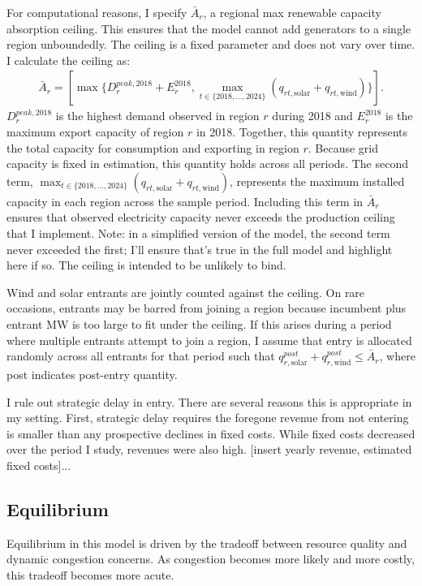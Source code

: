 \documentclass[12pt]{article}
\begin{document}
For computational reasons, I specify $\bar{A}_r$, a regional max renewable capacity absorption ceiling. This ensures that the model cannot add generators to a single region unboundedly. The ceiling is a fixed parameter and does not vary over time. I calculate the ceiling as: 
\begin{align}
    \bar{A}_r = [\max \{D^{peak,2018}_r + E^{2018}_r, \max_{t \in \{2018,\dots,2024\}} (q_{rt,\mathrm{solar}} + q_{rt,\mathrm{wind}})\}].
\end{align}
$D^{peak,2018}_r$ is the highest demand observed in region $r$ during 2018 and $E^{2018}_r$ is the maximum export capacity of region $r$ in 2018. Together, this quantity represents the total capacity for consumption and exporting in region $r$. Because grid capacity is fixed in estimation, this quantity holds across all periods. The second term, $\max_{t \in \{2018,...,2024\}} (q_{rt,\mathrm{solar}} + q_{rt,\mathrm{wind}})$, represents the maximum installed capacity in each region across the sample period. Including this term in $\bar{A}_r$ ensures that observed electricity capacity never exceeds the production ceiling that I implement. Note: in a simplified version of the model, the second term never exceeded the first; I'll ensure that's true in the full model and highlight here if so. The ceiling is intended to be unlikely to bind. 

Wind and solar entrants are jointly counted against the ceiling. On rare occasions, entrants may be barred from joining a region because incumbent plus entrant MW is too large to fit under the ceiling. If this arises during a period where multiple entrants attempt to join a region, I assume that entry is allocated randomly across all entrants for that period such that $q^{post}_{r,\mathrm{solar}} + q^{post}_{r,\mathrm{wind}} \leq \bar{A}_r$, where post indicates post-entry quantity.

I rule out strategic delay in entry. There are several reasons this is appropriate in my setting. First, strategic delay requires the foregone revenue from not entering is smaller than any prospective declines in fixed costs. While fixed costs decreased over the period I study, revenues were also high. [insert yearly revenue, estimated fixed costs]... 

\subsection{Equilibrium}

Equilibrium in this model is driven by the tradeoff between resource quality and dynamic congestion concerns. As congestion becomes more likely and more costly, this tradeoff becomes more acute. 
\end{document}
